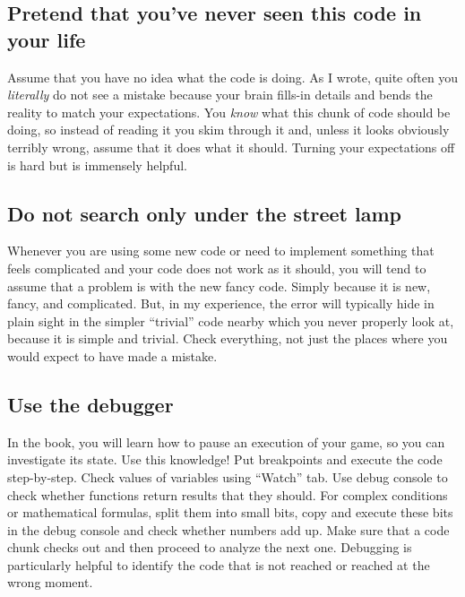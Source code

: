 \documentclass[
]{book}
\begin{document}
\hypertarget{pretend-that-youve-never-seen-this-code-in-your-life}{%
\subsection{Pretend that you've never seen this code in your life}\label{pretend-that-youve-never-seen-this-code-in-your-life}}

Assume that you have no idea what the code is doing. As I wrote, quite often you \emph{literally} do not see a mistake because your brain fills-in details and bends the reality to match your expectations. You \emph{know} what this chunk of code should be doing, so instead of reading it you skim through it and, unless it looks obviously terribly wrong, assume that it does what it should. Turning your expectations off is hard but is immensely helpful.

\hypertarget{do-not-search-only-under-the-street-lamp}{%
\subsection{Do not search only under the street lamp}\label{do-not-search-only-under-the-street-lamp}}

Whenever you are using some new code or need to implement something that feels complicated and your code does not work as it should, you will tend to assume that a problem is with the new fancy code. Simply because it is new, fancy, and complicated. But, in my experience, the error will typically hide in plain sight in the simpler ``trivial'' code nearby which you never properly look at, because it is simple and trivial. Check everything, not just the places where you would expect to have made a mistake.

\hypertarget{use-the-debugger}{%
\subsection{Use the debugger}\label{use-the-debugger}}

In the book, you will learn how to pause an execution of your game, so you can investigate its state. Use this knowledge! Put breakpoints and execute the code step-by-step. Check values of variables using ``Watch'' tab. Use debug console to check whether functions return results that they should. For complex conditions or mathematical formulas, split them into small bits, copy and execute these bits in the debug console and check whether numbers add up. Make sure that a code chunk checks out and then proceed to analyze the next one. Debugging is particularly helpful to identify the code that is not reached or reached at the wrong moment.
\end{document}
